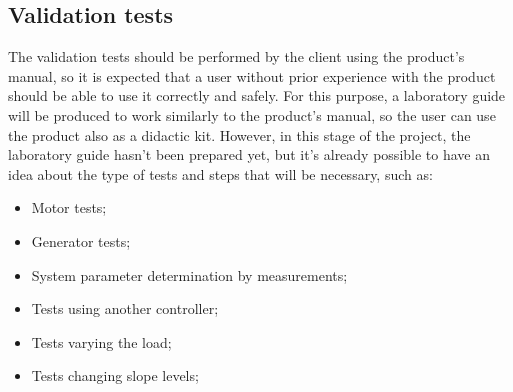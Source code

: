 \subsection{Validation tests}
\label{sec:orgff1a37d}
The validation tests should be performed by the client using the product’s
manual, so it is expected that a user without prior experience with the product
should be able to use it correctly and safely. 
For this purpose, a laboratory guide will be produced to work similarly to the
product’s manual, so the user can use the product also as a didactic kit. However, in this stage of the project, the laboratory guide hasn’t been prepared yet, but it’s already possible to have an idea about the type of tests and steps that will be necessary, such as:
\begin{itemize}
\item Motor tests;
\item Generator tests;
\item System parameter determination by measurements;
\item Tests using another controller;
\item Tests varying the load;
\item Tests changing slope levels;
\end{itemize}


